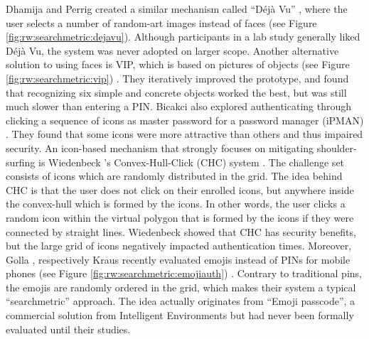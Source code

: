 	Dhamija and Perrig created a similar mechanism called ``Déjà Vu'' \cite{Dhamija2000DejaVu}, where the user selects a number of random-art images instead of faces (see Figure \ref{fig:rw:searchmetric:dejavu}). Although participants in a lab study generally liked Déjà Vu, the system was never adopted on larger scope. Another alternative solution to using faces is VIP, which is based on pictures of objects (see Figure \ref{fig:rw:searchmetric:vip}) \cite{DeAngeli2002VIP, DeAngeli2005PictureThousandWords}. They iteratively improved the prototype, and found that recognizing six simple and concrete objects worked the best, but was still much slower than entering a PIN. Bicakci \etal also explored authenticating through clicking a sequence of icons as master password for a password manager (iPMAN) \cite{Bicakci2011PWMIconBased}. They found that some icons were more attractive than others and thus impaired security. An icon-based mechanism that strongly focuses on mitigating shoulder-surfing is Wiedenbeck \etal's Convex-Hull-Click (CHC) system \cite{Wiedenbeck2006ConvexHull}. The challenge set consists of icons which are randomly distributed in the grid. The idea behind CHC is that the user does not click on their enrolled icons, but anywhere inside the convex-hull which is formed by the icons. In other words, the user clicks a random icon within the virtual polygon that is formed by the icons if they were connected by straight lines. Wiedenbeck \etal showed that CHC has security benefits, but the large grid of icons negatively impacted authentication times. Moreover, Golla \etal, respectively Kraus \etal recently evaluated emojis instead of PINs for mobile phones (see Figure \ref{fig:rw:searchmetric:emojiauth}) \cite{Golla2017EmojiAuth, Kraus2017Emoji}. Contrary to traditional pins, the emojis are randomly ordered in the grid, which makes their system a typical ``searchmetric'' approach. The idea actually originates from ``Emoji passcode'', a commercial solution from Intelligent Environments but had never been formally evaluated until their studies. 
	
